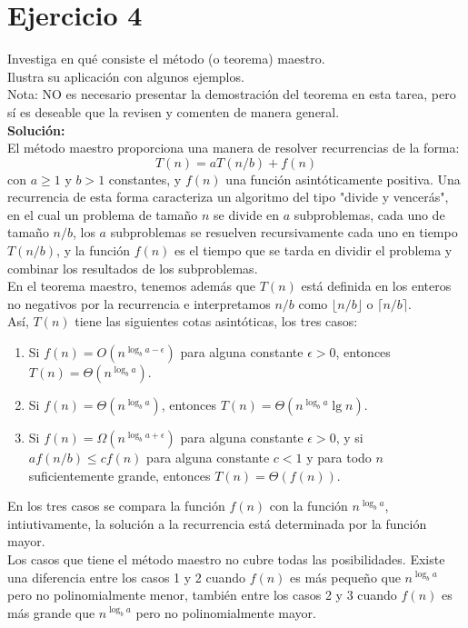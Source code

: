 \documentclass[12pt]{article}
\begin{document}
\section*{Ejercicio 4}
Investiga en qué consiste el método (o teorema) maestro.\\
Ilustra su aplicación con algunos ejemplos.\\
Nota: NO es necesario presentar la demostración del teorema en esta tarea, pero sí es deseable que la revisen y comenten de manera general.\\
\textbf{Solución:}\\
El método maestro proporciona una manera de resolver recurrencias de la forma:
\[
    T(n) = aT\left(n/b\right) + f(n)
\]
con $a \geq 1$ y $b > 1$ constantes, y $f(n)$ una función asintóticamente positiva. Una recurrencia de esta forma caracteriza un algoritmo del tipo "divide y vencerás", en el cual un problema de tamaño $n$ se divide en $a$ subproblemas, cada uno de tamaño $n/b$, los $a$ subproblemas se resuelven recursivamente cada uno en tiempo $T\left(n/b\right)$, y la función $f(n)$ es el tiempo que se tarda en dividir el problema y combinar los resultados de los subproblemas.\\
En el teorema maestro, tenemos además que $T(n)$ está definida en los enteros no negativos por la recurrencia e interpretamos $n/b$ como $\lfloor n/b \rfloor$ o $\lceil n/b \rceil$.\\
Así, $T(n)$ tiene las siguientes cotas asintóticas, los tres casos:
\begin{enumerate}
    \item Si $f(n) = O(n^{\log_b a - \epsilon})$ para alguna constante $\epsilon > 0$, entonces $T(n) = \Theta(n^{\log_b a})$.
    \item Si $f(n) = \Theta(n^{\log_b a})$, entonces $T(n) = \Theta(n^{\log_b a} \lg n)$.
    \item Si $f(n) = \Omega(n^{\log_b a + \epsilon})$ para alguna constante $\epsilon > 0$, y si $af(n/b) \leq cf(n)$ para alguna constante $c < 1$ y para todo $n$ suficientemente grande, entonces $T(n) = \Theta(f(n))$.
\end{enumerate}
En los tres casos se compara la función $f(n)$ con la función $n^{\log_b a}$, intiutivamente, la solución a la recurrencia está determinada por la función mayor.\\
Los casos que tiene el método maestro no cubre todas las posibilidades. Existe una diferencia entre los casos 1 y 2 cuando $f(n)$ es más pequeño que $n^{\log_b a}$ pero no polinomialmente menor, también entre los casos 2 y 3 cuando $f(n)$ es más grande que $n^{\log_b a}$ pero no polinomialmente mayor.\\
\end{document}

